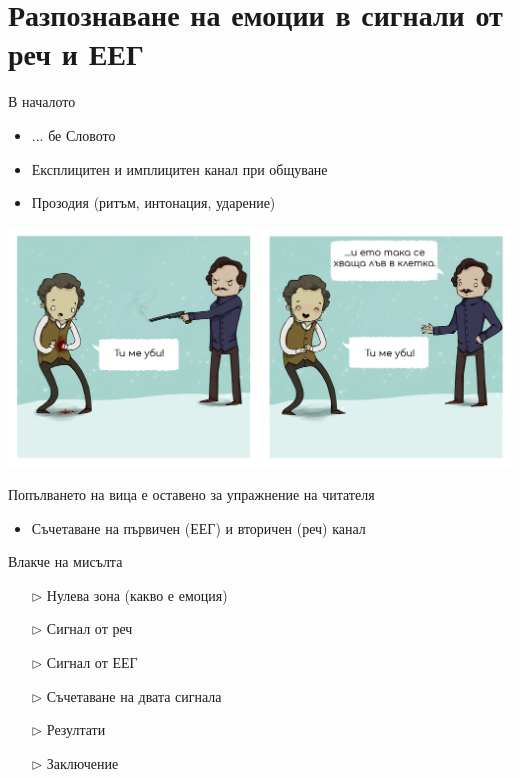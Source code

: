 \documentclass[9pt]{beamer}
\begin{document}
    \section{Разпознаване на емоции в сигнали от реч и ЕЕГ}
    \begin{frame}{В началото}
        \begin{itemize}
            \item ... бе Словото
            \pause 
            \item Експлицитен и имплицитен канал при общуване
            \pause 
            \item Прозодия (ритъм, интонация, ударение)
        \end{itemize}
        \pause 
        \begin{center}
            \includegraphics[width=\textwidth]{meaning.png}%

            \footnotesize{Попълването на вица е оставено за упражнение на читателя}
            \normalsize
        \end{center}
        \pause
        \begin{itemize}
            \item Съчетаване на първичен (ЕЕГ) и вторичен (реч) канал
        \end{itemize}        
    \end{frame}
    
    \begin{frame}{Влакче на мисълта}
        \begin{center}
        \begin{itemize}
            \setlength\itemsep{\fill}
            \item[$\triangleright$] Нулева зона (какво е емоция)
            \pause 
            \item[$\triangleright$] Сигнал от реч
            \pause 
            \item[$\triangleright$] Сигнал от ЕЕГ
            \pause 
            \item[$\triangleright$] Съчетаване на двата сигнала
            \pause 
            \item[$\triangleright$] Резултати
            \pause 
            \item[$\triangleright$] Заключение
        \end{itemize}
        \end{center}
    \end{frame}
\end{document}
